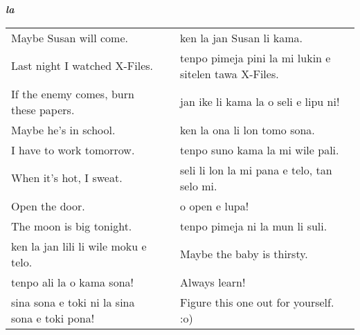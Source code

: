 \textbf{\textit{la}} 
\label{'la'}

\begin{supertabular}{p{5,5cm}|ll}
Maybe Susan will come.  && ken la jan Susan li kama. \\ %
Last night I watched X-Files.  && tenpo pimeja pini la mi lukin e sitelen tawa X-Files. \\ %
If the enemy comes, burn these papers.  && jan ike li kama la o seli e lipu ni! \\ %
Maybe he's in school.  && ken la ona li lon tomo sona. \\ %
I have to work tomorrow.  && tenpo suno kama la mi wile pali. \\ %
When it's hot, I sweat.  && seli li lon la mi pana e telo, tan selo mi. \\ %
Open the door.  && o open e lupa! \\ %
The moon is big tonight.  && tenpo pimeja ni la mun li suli. \\ %
ken la jan lili li wile moku e telo.  && Maybe the baby is thirsty. \\
tenpo ali la o kama sona!  && Always learn!  \\
sina sona e toki ni la sina sona e toki pona!  && Figure this one out for yourself. :o) \\
\end{supertabular}  
